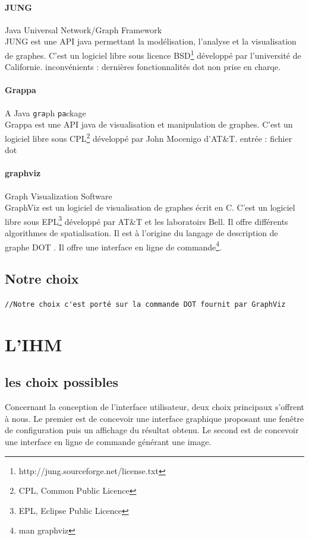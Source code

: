 		\paragraph{JUNG} Java Universal Network/Graph Framework\\
				JUNG est une API java permettant la modélisation, l'analyse et la visualisation de graphes. C'est un logiciel libre sous licence BSD\footnote{http://jung.sourceforge.net/license.txt} développé par l'université de Californie.
				inconvénients : dernières fonctionnalités dot non prise en charqe.
		\paragraph{Grappa} A Java \texttt{gra}ph \texttt{pa}ckage\\
			Grappa est une API java de visualisation et manipulation de graphes. C'est un logiciel libre sous CPL\footnote{CPL, Common Public Licence} développé par John Mocenigo d'AT\&T.
				 entrée : fichier dot
		\paragraph{graphviz} Graph Visualization Software\\
			GraphViz est un logiciel de visualisation de graphes écrit en C. C'est un logiciel libre sous EPL\footnote{EPL, Eclipse Public Licence} développé par AT\&T et les laboratoirs Bell. Il offre différents algorithmes de spatialisation. Il est à l'origine du langage de description de graphe \og DOT \fg{}. Il offre une interface en ligne de commande\footnote{man graphviz}.
				
  \subsection{Notre choix}
		\verb+//Notre choix c'est porté sur la commande DOT fournit par GraphViz+

\section{L'IHM}	
	\subsection{les choix possibles}
	\label{ihm_choix_possibles}
		Concernant la conception de l'interface utilisateur, deux choix principaux s'offrent à nous. Le premier est de concevoir
une interface graphique proposant une fenêtre de configuration puis un affichage du résultat obtenu. Le second est de concevoir 	une interface en ligne de commande générant une image. 	
	
